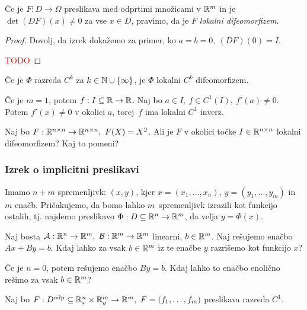 \begin{definicija}
    Če je $F: D \to \Omega$ preslikava med odprtimi množicami v $\mathbb{R}^m$ in je $\det(DF)(x) \neq 0$ za vse $x \in D$, pravimo, da je $F$ \emph{lokalni difeomorfizem}.
\end{definicija}

\begin{proof}
    Dovolj, da izrek dokažemo za primer, ko $a=b=0, \ (DF)(0) = I$.

    \textcolor{red}{TODO}
\end{proof}

\begin{posledica}
    Če je $\Phi$ razreda $C^k$ za $k \in \mathbb{N} \cup \left\{\infty\right\}$, je $\Phi$ lokalni $C^k$ difeomorfizem.
\end{posledica}

\begin{opomba}
    Če je $m=1$, potem $f: I \subseteq \mathbb{R} \to \mathbb{R}$. Naj bo $a \in I, \ f \in C^1(I), \ f'(a) \neq 0$. Potem $f'(x) \neq 0$ v okolici $a$, torej~$f$ ima lokalni $C^1$ inverz.
\end{opomba}

\begin{zgled}
    Naj bo $F: \mathbb{R}^{n \times n} \to \mathbb{R}^{n \times n}, \ F(X) = X^2$. Ali je $F$ v okolici točke $I \in \mathbb{R}^{n \times n}$ lokalni difeomorfizem? Kaj to pomeni?
\end{zgled}

\newpage
\subsubsection{Izrek o implicitni preslikavi}
Imamo $n+m$ spremenljivk: $(x, y)$, kjer $x = (x_1, \ldots, x_n), \ y = (y_1, \ldots, y_m)$ in $m$ enačb. Pričakujemo, da bomo lahko $m$~spremenljivk izrazili kot funkcijo ostalih, tj. najdemo preslikavo $\Phi: D \subseteq \mathbb{R}^n \to \mathbb{R}^m$, da velja $y = \Phi(x)$.


\begin{primer}
    Naj bosta $\mathcal{A}: \mathbb{R}^n \to \mathbb{R}^m, \ \mathcal{B}: \mathbb{R}^m \to \mathbb{R}^m$ linearni, $b \in \mathbb{R}^m$. Naj rešujemo enačbo $Ax + By = b$. Kdaj lahko za vsak $b \in \mathbb{R}^m$ iz te  enačbe $y$ razrišemo kot funkcijo $x$? 

    Če je $n=0$, potem rešujemo enačbo $By = b$. Kdaj lahko to enačbo enolično rešimo za vsak $b \in \mathbb{R}^m$?
\end{primer}

Naj bo $F: D^\text{odp} \subseteq \mathbb{R}^n_x \times \mathbb{R}^m_y \to \mathbb{R}^m, \ F = (f_1, \ldots, f_m)$ preslikava razreda $C^1$. 

